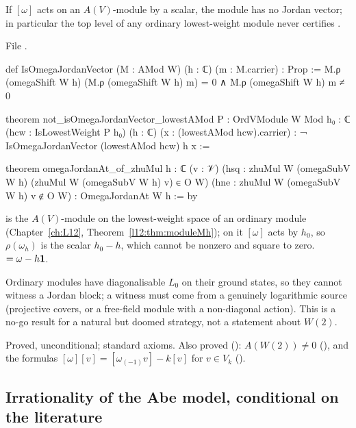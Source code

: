 \begin{theorem}\label{l18:thm:obstruction}
If $[\omega]$ acts on an $A(V)$-module by a scalar, the module has no Jordan vector; in particular the
top level of any ordinary lowest-weight module never certifies .
\end{theorem}
\noindent File .
\begin{leancode}
def IsOmegaJordanVector (M : AMod W) (h : ℂ) (m : M.carrier) : Prop :=
  M.ρ (omegaShift W h) (M.ρ (omegaShift W h) m) = 0 ∧ M.ρ (omegaShift W h) m ≠ 0

theorem not_isOmegaJordanVector_lowestAMod {P : OrdVModule W Mod} {h₀ : ℂ}
    (hcw : IsLowestWeight P h₀) (h : ℂ) (x : (lowestAMod hcw).carrier) :
    ¬ IsOmegaJordanVector (lowestAMod hcw) h x :=

theorem omegaJordanAt_of_zhuMul {h : ℂ} (v : 𝒱)
    (hsq : zhuMul W (omegaSubV W h) (zhuMul W (omegaSubV W h) v) ∈ O W)
    (hne : zhuMul W (omegaSubV W h) v ∉ O W) :
    OmegaJordanAt W h := by
\end{leancode}
\begin{dictionary}
 is the $A(V)$-module on the lowest-weight space of an ordinary module
(Chapter~\ref{ch:L12}, Theorem~\ref{l12:thm:moduleMh}); on it $[\omega]$ acts by $h_0$, so
$\rho(\omega_h)$ is the scalar $h_0-h$, which cannot be nonzero and square to zero.  $=\omega-h\mathbf{1}$.
\end{dictionary}
\begin{physics}
Ordinary modules have diagonalisable $L_0$ on their ground states, so they cannot witness a Jordan block;
a witness must come from a genuinely logarithmic source (projective covers, or a free-field module with a
non-diagonal action). This is a no-go result for a natural but doomed strategy, not a statement about $W(2)$.
\end{physics}
\begin{status}
Proved, unconditional; standard axioms. Also proved (): $A(W(2))\ne0$
(), and the formulas $[\omega][v]=[\omega_{(-1)}v]-k[v]$ for $v\in V_k$
().
\end{status}

\subsection{Irrationality of the Abe model, conditional on the literature}

